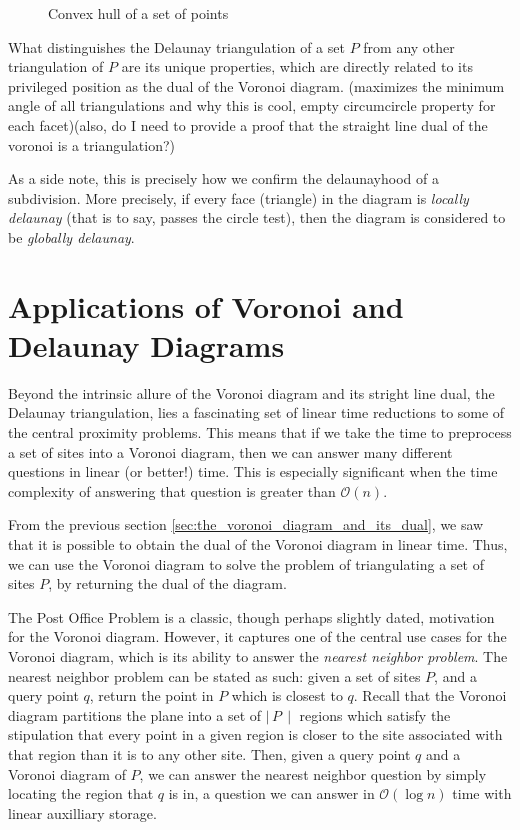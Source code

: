 \documentclass[12pt,twoside]{reedthesis}
\begin{document}
  \begin{figure}[!htb]
    \centering
    
    \caption{Convex hull of a set of points}
    \label{fig:convex_hull}
  \end{figure}

  What distinguishes the Delaunay triangulation of a set $P$ from any other triangulation of $P$ are its unique properties, which are directly related to its privileged position as the dual of the Voronoi diagram. (maximizes the minimum angle of all triangulations and why this is cool, empty circumcircle property for each facet)(also, do I need to provide a proof that the straight line dual of the voronoi is a triangulation?)

  As a side note, this is precisely how we confirm the delaunayhood of a subdivision. More precisely, if every face (triangle) in the diagram is \emph{locally delaunay} (that is to say, passes the circle test), then the diagram is considered to be \emph{globally delaunay}.


  \section{Applications of Voronoi and Delaunay Diagrams} %
  \label{sec:applications_of_voronoi_and_delaunay_diagrams}
  Beyond the intrinsic allure of the Voronoi diagram and its stright line dual, the Delaunay triangulation, lies a fascinating set of linear time reductions to some of the central proximity problems. This means that if we take the time to preprocess a set of sites into a Voronoi diagram, then we can answer many different questions in linear (or better!) time. This is especially significant when the time complexity of answering that question is greater than $\mathcal{O}(n)$.\par 

  From the previous section \cref{sec:the_voronoi_diagram_and_its_dual}, we saw that it is possible to obtain the dual of the Voronoi diagram in linear time. Thus, we can use the Voronoi diagram to solve the problem of triangulating a set of sites $P$, by returning the dual of the diagram. 

  The Post Office Problem is a classic, though perhaps slightly dated, motivation for the Voronoi diagram. However, it captures one of the central use cases for the Voronoi diagram, which is its ability to answer the \emph{nearest neighbor problem}. The nearest neighbor problem can be stated as such: given a set of sites $P$, and a query point $q$, return the point in $P$ which is closest to $q$. Recall that the Voronoi diagram partitions the plane into a set of $\mid\,P\,\mid$ regions which satisfy the stipulation that every point in a given region is closer to the site associated with that region than it is to any other site. Then, given a query point $q$ and a Voronoi diagram of $P$, we can answer the nearest neighbor question by simply locating the region that $q$ is in, a question we can answer in $\mathcal{O}(\log n)$ time with linear auxilliary storage.\citep{shamos, p 214}\par
  
\end{document}
